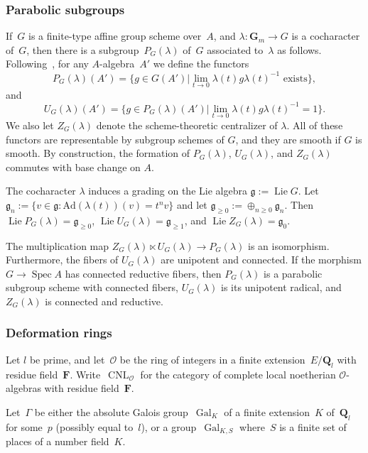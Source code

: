 \documentclass{amsart}
\renewcommand{\mathbb}{\mathbf}
\renewcommand{\ell}{l}
\def\Ad{\mathrm{Ad}}
\DeclareMathOperator{\Lie}{Lie}
\newcommand{\CNL}{\operatorname{CNL}}
\theoremstyle{definition}
\theoremstyle{remark}
\newcommand{\F}{\FF}
\newcommand{\Q}{\QQ}
\newcommand{\FF}{{\mathbb F}}
\newcommand{\GG}{{\mathbb G}}
\newcommand{\QQ}{{\mathbb Q}}
\newcommand{\cO}{{\mathcal O}}
\newcommand{\Ql}{\Q_{\ell}}
\DeclareMathOperator{\Gal}{Gal}
\DeclareMathOperator{\Spec}{Spec}
\newcommand{\Gm}{\GG_m}
\begin{document}
\subsubsection{Parabolic subgroups}\label{subsec: parabolic subgroups}If~$G$
is a finite-type affine group scheme over~$A$,  and $\lambda:\Gm\to G$ is a
cocharacter of~$G$, then there is a
subgroup~$P_G(\lambda)$ of~$G$
associated to~$\lambda$ as follows. Following~\cite[\S I.2.1]{predbook}, for any
$A$-algebra~$A'$ we define the functors \[ P_G(\lambda)(A')=\{g\in G(A') |
  \lim_{t\rightarrow 0}\lambda(t)g\lambda(t)^{-1}\textrm{ exists}\},\]
and \[  U_G(\lambda)(A')=\{g\in P_G(\lambda)(A') |
  \lim_{t\rightarrow 0}\lambda(t)g\lambda(t)^{-1}=1\}.\] 
We also let $Z_G(\lambda)$ denote the
scheme-theoretic centralizer of $\lambda$.  All of these functors are representable by subgroup schemes of $G$, and they are smooth if $G$ is smooth.  By construction, the formation of $P_G(\lambda)$, $U_G(\lambda)$, and $Z_G(\lambda)$ commutes with base change on $A$.

The cocharacter $\lambda$ induces a grading on the Lie algebra $\mathfrak{g}:=\Lie G$.  Let $\mathfrak{g}_n:=\{v\in\mathfrak{g} : \Ad(\lambda(t))(v)=t^nv\}$ and let $\mathfrak{g}_{\geq 0}:=\oplus_{n\geq 0}\mathfrak{g}_n$.  Then $\Lie P_G(\lambda)=\mathfrak{g}_{\geq 0}$, $\Lie U_G(\lambda)=\mathfrak{g}_{\geq 1}$, and $\Lie Z_G(\lambda)=\mathfrak{g}_0$.

The multiplication map $Z_G(\lambda)\ltimes U_G(\lambda)\rightarrow
P_G(\lambda)$ is an isomorphism.  Furthermore, the fibers of
$U_G(\lambda)$ are unipotent and connected. If the morphism $G\rightarrow\Spec A$ has connected reductive fibers, then $P_G(\lambda)$ is a parabolic subgroup scheme with connected fibers, $U_G(\lambda)$ is its unipotent radical, and $Z_G(\lambda)$ is connected and reductive.

\subsubsection{Deformation rings}\label{subsec: deformation rings}Let $l$ be prime, and let~$\cO$ be
the ring of integers in a finite extension~$E/\Ql$ with residue
field~$\F$. Write~$\CNL_{\cO}$ for the category of complete local
noetherian $\cO$-algebras with residue field~$\F$. 

Let~$\Gamma$ be either the absolute Galois group~$\Gal_K$ of a finite
extension~$K$ of~$\Ql$ for some~$p$ (possibly equal to~$l$), or a
group~$\Gal_{K,S}$ where~$S$ is a finite set of places of a number field~$K$.
\end{document}
